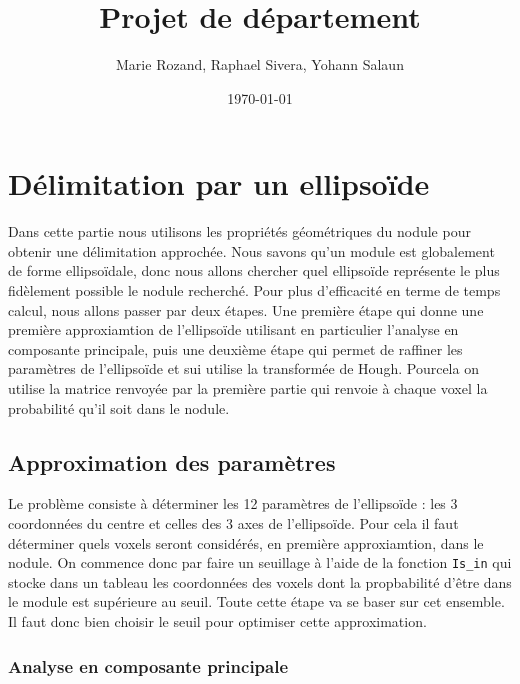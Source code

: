 \documentclass{article}
\title{Projet de département}
\author{Marie Rozand, Raphael Sivera, Yohann Salaun}
\date{\today}
\begin{document}
\maketitle
\section{Délimitation par un ellipsoïde}

Dans cette partie nous utilisons les propriétés géométriques du nodule pour obtenir une délimitation approchée. Nous savons qu'un module est globalement de forme ellipsoïdale, donc nous allons chercher quel ellipsoïde représente le plus fidèlement possible le nodule recherché. Pour plus d'efficacité en terme de temps calcul, nous allons passer par deux étapes. Une première étape qui donne une première approxiamtion de l'ellipsoïde utilisant en particulier l'analyse en composante principale, puis une deuxième étape qui permet de raffiner les paramètres de l'ellipsoïde et sui utilise la transformée de Hough. Pourcela on utilise la matrice renvoyée par la première partie qui renvoie à chaque voxel la probabilité qu'il soit dans le nodule.

\subsection{Approximation des paramètres}

Le problème consiste à déterminer les 12 paramètres de l'ellipsoïde : les 3 coordonnées du centre et celles des 3 axes de l'ellipsoïde. Pour cela il faut déterminer quels voxels seront considérés, en première approxiamtion, dans le nodule. On commence donc par faire un seuillage à  l'aide de la fonction  \texttt{Is\_in} qui stocke dans un tableau les coordonnées des voxels dont la propbabilité d'être dans le module est supérieure au seuil. Toute cette étape va se baser sur cet ensemble. Il faut donc bien choisir le seuil pour optimiser cette approximation.

\subsubsection{Analyse en composante principale}
\end{document}
